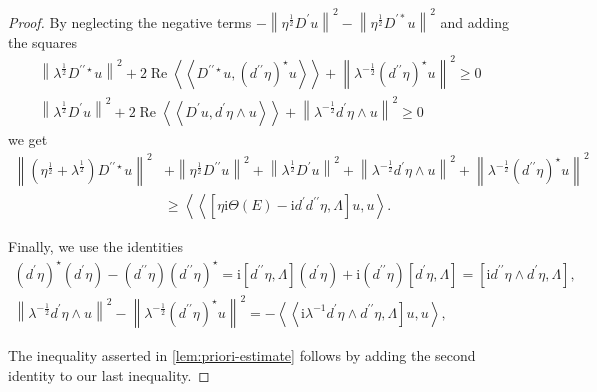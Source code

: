 \documentclass[lang=en,12pt]{beautybook}
\begin{document}
\begin{proof}
By neglecting the negative terms $-\left\|\eta^{\frac{1}{2}} D^{\prime} u\right\|^2-\left\|\eta^{\frac{1}{2}} D^{\prime *} u\right\|^2$ and adding the squares
$$
\begin{array}{r}
\left\|\lambda^{\frac{1}{2}} D^{\prime \prime \star} u\right\|^2+2 \operatorname{Re}\left\langle\left\langle D^{\prime \prime \star} u,\left(d^{\prime \prime} \eta\right)^{\star} u\right\rangle\right\rangle+\left\|\lambda^{-\frac{1}{2}}\left(d^{\prime \prime} \eta\right)^{\star} u\right\|^2 \geqslant 0 \\
\left\|\lambda^{\frac{1}{2}} D^{\prime} u\right\|^2+2 \operatorname{Re}\left\langle\left\langle D^{\prime} u, d^{\prime} \eta \wedge u\right\rangle\right\rangle+\left\|\lambda^{-\frac{1}{2}} d^{\prime} \eta \wedge u\right\|^2 \geqslant 0
\end{array}
$$
we get
$$
\begin{aligned}
\left\|\left(\eta^{\frac{1}{2}}+\lambda^{\frac{1}{2}}\right) D^{\prime \prime \star} u\right\|^2 & +\left\|\eta^{\frac{1}{2}} D^{\prime \prime} u\right\|^2+\left\|\lambda^{\frac{1}{2}} D^{\prime} u\right\|^2+\left\|\lambda^{-\frac{1}{2}} d^{\prime} \eta \wedge u\right\|^2+\left\|\lambda^{-\frac{1}{2}}\left(d^{\prime \prime} \eta\right)^{\star} u\right\|^2 \\
& \geqslant\left\langle\left\langle\left[\eta \mathrm{i} \Theta(E)-\mathrm{i} d^{\prime} d^{\prime \prime} \eta, \Lambda\right] u, u\right\rangle .\right.
\end{aligned}
$$

Finally, we use the identities
$$
\begin{gathered}
\left(d^{\prime} \eta\right)^{\star}\left(d^{\prime} \eta\right)-\left(d^{\prime \prime} \eta\right)\left(d^{\prime \prime} \eta\right)^{\star}=\mathrm{i}\left[d^{\prime \prime} \eta, \Lambda\right]\left(d^{\prime} \eta\right)+\mathrm{i}\left(d^{\prime \prime} \eta\right)\left[d^{\prime} \eta, \Lambda\right]=\left[\mathrm{i} d^{\prime \prime} \eta \wedge d^{\prime} \eta, \Lambda\right], \\
\left\|\lambda^{-\frac{1}{2}} d^{\prime} \eta \wedge u\right\|^2-\left\|\lambda^{-\frac{1}{2}}\left(d^{\prime \prime} \eta\right)^{\star} u\right\|^2=-\left\langle\left\langle\mathrm{i} \lambda^{-1} d^{\prime} \eta \wedge d^{\prime \prime} \eta, \Lambda\right] u, u\right\rangle,
\end{gathered}
$$

The inequality asserted in \autoref{lem:priori-estimate} follows by adding the second identity to our last inequality.
\end{proof}
\end{document}
